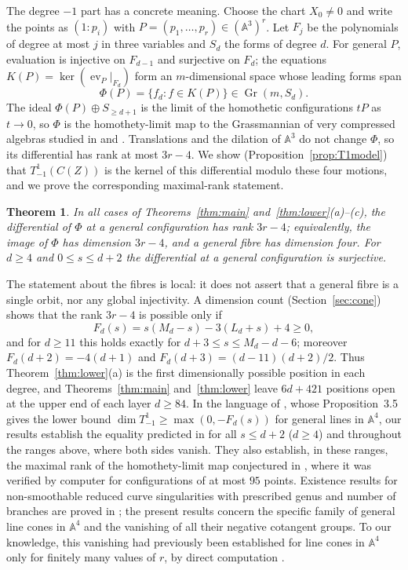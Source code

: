 \documentclass{amsart}
\newtheorem{theorem}{Theorem}[section]
\theoremstyle{definition}
\theoremstyle{remark}
\numberwithin{equation}{section}
\newcommand{\A}{\mathbb{A}}
\DeclareMathOperator{\ev}{ev}
\DeclareMathOperator{\Gr}{Gr}
\begin{document}
The degree $-1$ part has a concrete meaning. Choose the chart $X_0\ne0$ and write the points
as $(1:p_i)$ with $P=(p_1,\dots,p_r)\in(\A^3)^r$. Let $F_j$ be the polynomials of degree at
most $j$ in three variables and $S_d$ the forms of degree $d$. For general $P$, evaluation is
injective on $F_{d-1}$ and surjective on $F_d$; the equations $K(P)=\ker(\ev_P|_{F_d})$ form
an $m$-dimensional space whose leading forms span
\[
  \Phi(P)=\{f_d:f\in K(P)\}\in\Gr(m,S_d).
\]
The ideal $\Phi(P)\oplus S_{\ge d+1}$ is the limit of the homothetic configurations $tP$ as
$t\to0$, so $\Phi$ is the homothety-limit map to the Grassmannian of very compressed algebras
studied in \cite[Section~5]{DJNT} and \cite[Section~2.3]{JelOpen}. Translations and the
dilation of $\A^3$ do not change $\Phi$, so its differential has rank at most $3r-4$. We
show (Proposition~\ref{prop:T1model}) that $T^1_{-1}(C(Z))$ is the kernel of this differential
modulo these four motions, and we prove the corresponding maximal-rank statement.

\begin{theorem}\label{thm:rank}
In all cases of Theorems~\ref{thm:main} and~\ref{thm:lower}\textup{(a)--(c)}, the
differential of $\Phi$ at a general configuration has rank $3r-4$; equivalently, the image of
$\Phi$ has dimension $3r-4$, and a general fibre has dimension four. For $d\ge4$ and
$0\le s\le d+2$ the differential at a general configuration is surjective.
\end{theorem}

The statement about the fibres is local: it does not assert that a general fibre is a single
orbit, nor any global injectivity. A dimension count (Section~\ref{sec:cone}) shows that the
rank $3r-4$ is possible only if
\[
  F_d(s)=s(M_d-s)-3(L_d+s)+4\ge0 ,
\]
and for $d\ge11$ this holds exactly for $d+3\le s\le M_d-d-6$; moreover
$F_d(d+2)=-4(d+1)$ and $F_d(d+3)=(d-11)(d+2)/2$. Thus Theorem~\ref{thm:lower}(a) is the
first dimensionally possible position in each degree, and Theorems~\ref{thm:main}
and~\ref{thm:lower} leave $6d+421$ positions open at the upper end of each layer $d\ge84$. In
the language of \cite{Stevens}, whose Proposition~3.5 gives the lower bound
$\dim T^1_{-1}\ge\max(0,-F_d(s))$ for general lines in $\A^4$, our results establish the
equality predicted in \cite[Conjecture~3.6]{Stevens} for all $s\le d+2$ ($d\ge4$) and
throughout the ranges above, where both sides vanish. They also establish, in these ranges,
the maximal rank of the homothety-limit map conjectured in \cite[Remark~5.4]{DJNT}, where it
was verified by computer for configurations of at most $95$ points. Existence results for
non-smoothable reduced curve singularities with prescribed genus and number of branches are
proved in \cite[Theorem~1.5]{Bozlee}; the present results concern the specific family of general line cones
in $\A^4$ and the vanishing of all their negative cotangent groups. To our knowledge, this
vanishing had previously been established for line cones in $\A^4$ only for finitely many
values of $r$, by direct computation \cite[Section~3.2]{Stevens}.
\end{document}
